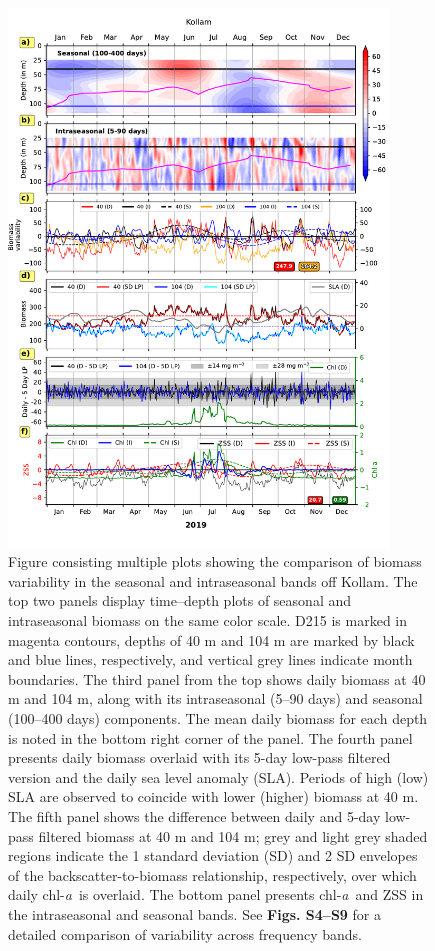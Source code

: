 \documentclass[authoryear,review,11pt]{elsarticle}
\newcommand{\chla}{chl-{\emph{a}}}
\begin{document}
\begin{figure}[htbp]
	\begin{adjustwidth}{-0.5in}{0in} 
		\centering
		\includegraphics[width=0.9\textwidth]{./figures/biomass_intra_2019_kollam.pdf} 
		\captionsetup{justification=justified,font=footnotesize,skip=0.05\baselineskip,width=\textwidth}
		\caption{Figure consisting multiple plots showing the comparison of biomass variability in the seasonal and intraseasonal bands off Kollam. The top two panels display time--depth plots of seasonal and intraseasonal biomass on the same color scale. D215 is marked in magenta contours, depths of 40 m and 104 m are marked by black and blue lines, respectively, and vertical grey lines indicate month boundaries. The third panel from the top shows daily biomass at 40 m and 104 m, along with its intraseasonal (5--90 days) and seasonal (100--400 days) components. The mean daily biomass for each depth is noted in the bottom right corner of the panel. The fourth panel presents daily biomass overlaid with its 5-day low-pass filtered version and the daily sea level anomaly (SLA). Periods of high (low) SLA are observed to coincide with lower (higher) biomass at 40 m. The fifth panel shows the difference between daily and 5-day low-pass filtered biomass at 40 m and 104 m; grey and light grey shaded regions indicate the 1 standard deviation (SD) and 2 SD envelopes of the backscatter-to-biomass relationship, respectively, over which daily \chla\ is overlaid. The bottom panel presents \chla\ and ZSS in the intraseasonal and seasonal bands. See \textbf{Figs. S4--S9} for a detailed comparison of variability across frequency bands.}		
		\label{fig:biomass_intra_2019_kollam}
	\end{adjustwidth}
\end{figure}
\end{document}
